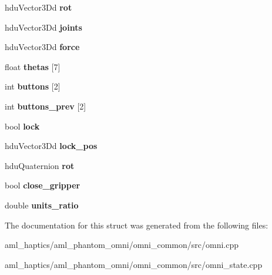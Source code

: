 \begin{DoxyCompactItemize}
\item 
\hypertarget{struct_omni_state_a4e93ee3d45ef9ffbcab56b639ea74c77}{hdu\-Vector3\-Dd {\bfseries rot}}\label{struct_omni_state_a4e93ee3d45ef9ffbcab56b639ea74c77}

\item 
\hypertarget{struct_omni_state_a9d16df6231c01e6a6494ca9718c175ee}{hdu\-Vector3\-Dd {\bfseries joints}}\label{struct_omni_state_a9d16df6231c01e6a6494ca9718c175ee}

\item 
\hypertarget{struct_omni_state_aee745672b2a734ed7f9c3c8761d5b178}{hdu\-Vector3\-Dd {\bfseries force}}\label{struct_omni_state_aee745672b2a734ed7f9c3c8761d5b178}

\item 
\hypertarget{struct_omni_state_a95593867c19d3fa98fbeb252a88eb4d2}{float {\bfseries thetas} \mbox{[}7\mbox{]}}\label{struct_omni_state_a95593867c19d3fa98fbeb252a88eb4d2}

\item 
\hypertarget{struct_omni_state_ad371d456366afcaaa394e5f635aa6c63}{int {\bfseries buttons} \mbox{[}2\mbox{]}}\label{struct_omni_state_ad371d456366afcaaa394e5f635aa6c63}

\item 
\hypertarget{struct_omni_state_a62d864ed2183bd2943a31044aea47336}{int {\bfseries buttons\-\_\-prev} \mbox{[}2\mbox{]}}\label{struct_omni_state_a62d864ed2183bd2943a31044aea47336}

\item 
\hypertarget{struct_omni_state_af40a2d7f226d5cf70df4ba52b829a16a}{bool {\bfseries lock}}\label{struct_omni_state_af40a2d7f226d5cf70df4ba52b829a16a}

\item 
\hypertarget{struct_omni_state_ae4296013fd8bc9449eb0ab8ec644702c}{hdu\-Vector3\-Dd {\bfseries lock\-\_\-pos}}\label{struct_omni_state_ae4296013fd8bc9449eb0ab8ec644702c}

\item 
\hypertarget{struct_omni_state_a0a3af6476f338f9ee050d5151fcfa47a}{hdu\-Quaternion {\bfseries rot}}\label{struct_omni_state_a0a3af6476f338f9ee050d5151fcfa47a}

\item 
\hypertarget{struct_omni_state_a7195e73446512ca370af3ed80a6c573a}{bool {\bfseries close\-\_\-gripper}}\label{struct_omni_state_a7195e73446512ca370af3ed80a6c573a}

\item 
\hypertarget{struct_omni_state_abcf42fc08a4d9ef5093c4fac26fb7846}{double {\bfseries units\-\_\-ratio}}\label{struct_omni_state_abcf42fc08a4d9ef5093c4fac26fb7846}

\end{DoxyCompactItemize}


The documentation for this struct was generated from the following files\-:\begin{DoxyCompactItemize}
\item 
aml\-\_\-haptics/aml\-\_\-phantom\-\_\-omni/omni\-\_\-common/src/omni.\-cpp\item 
aml\-\_\-haptics/aml\-\_\-phantom\-\_\-omni/omni\-\_\-common/src/omni\-\_\-state.\-cpp\end{DoxyCompactItemize}
